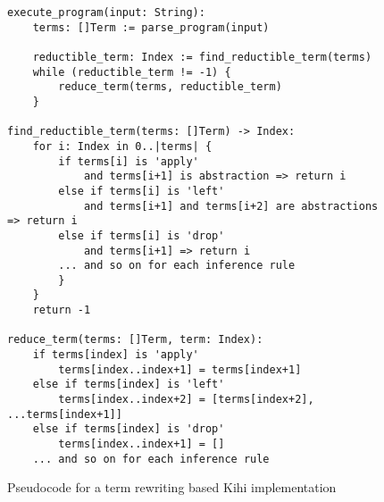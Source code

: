 \begin{figure}[!htb]
    \centering
    \begin{lstlisting}
execute_program(input: String):
    terms: []Term := parse_program(input)
    
    reductible_term: Index := find_reductible_term(terms)
    while (reductible_term != -1) {
        reduce_term(terms, reductible_term)
    }

find_reductible_term(terms: []Term) -> Index:
    for i: Index in 0..|terms| {
        if terms[i] is 'apply'
            and terms[i+1] is abstraction => return i
        else if terms[i] is 'left'
            and terms[i+1] and terms[i+2] are abstractions => return i
        else if terms[i] is 'drop'
            and terms[i+1] => return i
        ... and so on for each inference rule
        }
    }
    return -1

reduce_term(terms: []Term, term: Index):
    if terms[index] is 'apply'
        terms[index..index+1] = terms[index+1]
    else if terms[index] is 'left'
        terms[index..index+2] = [terms[index+2], ...terms[index+1]]
    else if terms[index] is 'drop'
        terms[index..index+1] = []
    ... and so on for each inference rule
    \end{lstlisting}
    \caption{Pseudocode for a term rewriting based Kihi implementation}
    \label{fig:term_rewriting_pseudocode}
\end{figure}